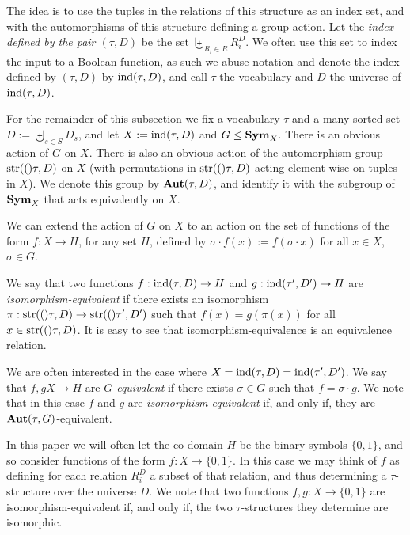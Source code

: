 \documentclass[../paper.tex]{subfiles}
\begin{document}
The idea is to use the tuples in the relations of this structure as an index
set, and with the automorphisms of this structure defining a group action. Let
the \emph{index defined by the pair $(\tau, D)$} be the set $\biguplus_{R_i\in
  R} R^{D}_i$. We often use this set to index the input to a Boolean function,
as such we abuse notation and denote the index defined by $(\tau, D)$ by
$\text{\upshape ind}(\tau, D)$, and call $\tau$ the vocabulary and $D$ the universe of
$\text{\upshape ind}(\tau, D)$.

For the remainder of this subsection we fix a vocabulary $\tau$ and a
many-sorted set $D := \biguplus_{s \in S} D_{s}$, and let $X := \text{\upshape ind} (\tau, D)$
and $G \leq \text{\textbf{Sym}}_{X}$. There is an obvious action of $G$ on $X$. There is also
an obvious action of the automorphism group $\text{str}(()\tau, D)$ on $X$ (with
permutations in $\text{str}(()\tau, D)$ acting element-wise on tuples in $X$). We denote
this group by $\text{\textbf{Aut}}(\tau, D)$, and identify it with the subgroup of $\text{\textbf{Sym}}_X$
that acts equivalently on $X$.

We can extend the action of $G$ on $X$ to an action on the set of functions of
the form $f: X \rightarrow H$, for any set $H$, defined by $\sigma \cdot f(x) :=
f(\sigma \cdot x)$ for all $x \in X$, $\sigma \in G$.




We say that two functions $f: \text{\upshape ind}(\tau, D) \rightarrow H$ and $g: \text{\upshape ind}(\tau',
D') \rightarrow H$ are \emph{isomorphism-equivalent} if there exists an
isomorphism $\pi :\text{str}(()\tau, D) \rightarrow \text{str}(()\tau', D')$ such that $f (x) =
g (\pi (x))$ for all $x \in \text{str}(()\tau, D)$. It is easy to see that
isomorphism-equivalence is an equivalence relation.

We are often interested in the case where $X = \text{\upshape ind}(\tau, D) = \text{\upshape ind}(\tau', D')$.
We say that $f, g X \rightarrow H$ are \emph{$G$-equivalent} if there exists
$\sigma \in G$ such that $f = \sigma \cdot g$. We note that in this case $f$ and
$g$ are \emph{isomorphism-equivalent} if, and only if, they are $\text{\textbf{Aut}}(\tau,
G)$-equivalent.

In this paper we will often let the co-domain $H$ be the binary symbols
$\{0,1\}$, and so consider functions of the form $f : X \rightarrow \{0,1\}$. In
this case we may think of $f$ as defining for each relation $R^D_i$ a subset of
that relation, and thus determining a $\tau$-structure over the universe $D$. We
note that two functions $f, g: X \rightarrow \{0,1\}$ are isomorphism-equivalent
if, and only if, the two $\tau$-structures they determine are isomorphic.
\end{document}
